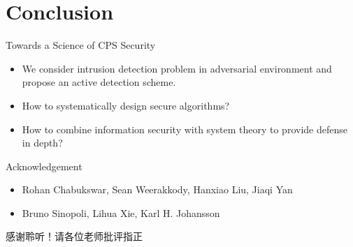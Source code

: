 \documentclass[10pt]{beamer}
\begin{document}
\section{Conclusion}




\begin{frame}{Towards a Science of CPS Security}
  \begin{itemize}
  \item We consider intrusion detection problem in adversarial environment and propose an active detection scheme.
  \item How to systematically design secure algorithms?
  \item How to combine information security with system theory to provide defense in depth?
  \end{itemize}
\end{frame}

\begin{frame}{Acknowledgement}
  \begin{itemize}
  \item Rohan Chabukswar, Sean Weerakkody, Hanxiao Liu, Jiaqi Yan
  \item Bruno Sinopoli, Lihua Xie, Karl H. Johansson
  \end{itemize}
\end{frame}

\begin{frame}[standout]
  感谢聆听！请各位老师批评指正
\end{frame}
\end{document}
